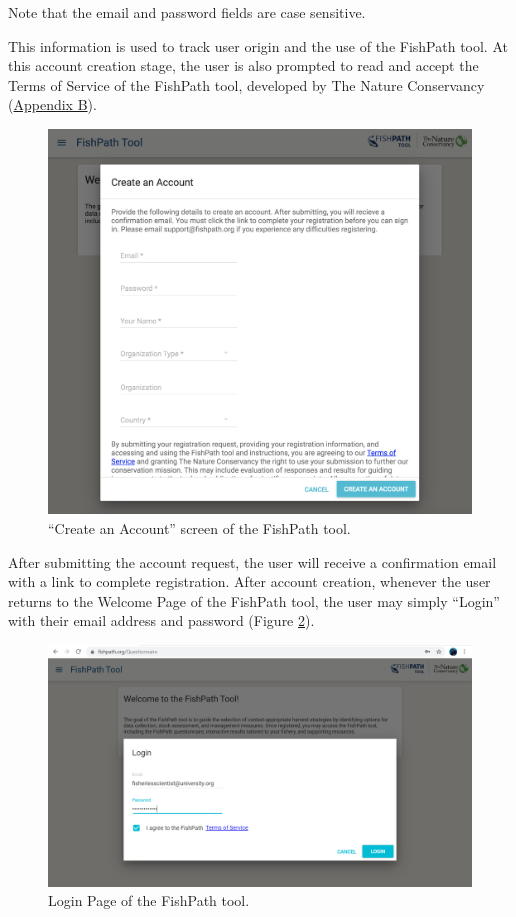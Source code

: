 \documentclass[
  11pt,
]{book}
\begin{document}
Note that the email and password fields are case sensitive.

This information is used to track user origin and the use of the FishPath tool. At this account creation stage, the user is also prompted to read and accept the Terms of Service of the FishPath tool, developed by The Nature Conservancy (\protect\hyperlink{terms}{Appendix B}).

\begin{figure}

{\centering \includegraphics[width=0.95\linewidth]{images/create-account} 

}

\caption{“Create an Account” screen of the FishPath tool.}\label{fig:create-account}
\end{figure}

After submitting the account request, the user will receive a confirmation email with a link to complete registration. After account creation, whenever the user returns to the Welcome Page of the FishPath tool, the user may simply ``Login'' with their email address and password (Figure \ref{fig:login-page}).

\begin{figure}

{\centering \includegraphics[width=0.95\linewidth]{images/login-page} 

}

\caption{Login Page of the FishPath tool.}\label{fig:login-page}
\end{figure}
\end{document}
